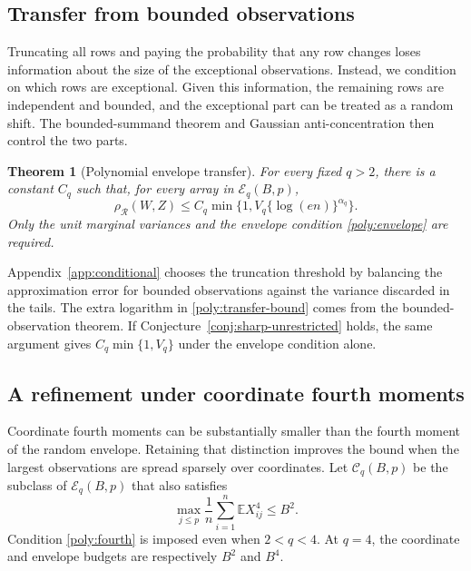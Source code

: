\documentclass[11pt,letterpaper]{article}
\newtheorem{theorem}{Theorem}
\theoremstyle{remark}
\newcommand{\E}{\mathbb E}
\newcommand{\rh}{\rho_{\mathcal R}}
\begin{document}
\subsection{Transfer from bounded observations}\label{poly:transfer-sec}

Truncating all rows and paying the probability that any row changes
loses information about the size of the exceptional observations.
Instead, we condition on which rows are exceptional. Given this
information, the remaining rows are independent and bounded, and the
exceptional part can be treated as a random shift. The bounded-summand
theorem and Gaussian anti-concentration then control the two parts.

\begin{theorem}[Polynomial envelope transfer]\label{poly:transfer}
For every fixed \(q>2\), there is a constant \(C_q\) such that, for
every array in \(\mathcal E_q(B,p)\),
\begin{equation}
 \rh(W,Z)\le C_q\min\{1,V_q\{\log(en)\}^{\alpha_q}\}.
 \label{poly:transfer-bound}
\end{equation}
Only the unit marginal variances and the envelope condition
\eqref{poly:envelope} are required.
\end{theorem}

Appendix~\ref{app:conditional} chooses the truncation threshold by
balancing the approximation error for bounded observations against the
variance discarded in the tails. The extra logarithm in
\eqref{poly:transfer-bound} comes from the bounded-observation theorem.
If Conjecture~\ref{conj:sharp-unrestricted} holds, the same argument
gives \(C_q\min\{1,V_q\}\) under the envelope condition alone.

\subsection{A refinement under coordinate fourth moments}\label{poly:bennett-sec}

Coordinate fourth moments can be substantially smaller than the fourth
moment of the random envelope. Retaining that distinction improves the
bound when the largest observations are spread sparsely over coordinates.
Let \(\mathcal C_q(B,p)\) be the subclass of \(\mathcal E_q(B,p)\)
that also satisfies
\begin{equation}
 \max_{j\le p}\frac1n\sum_{i=1}^n\E X_{ij}^4\le B^2.
 \label{poly:fourth}
\end{equation}
Condition \eqref{poly:fourth} is imposed even when \(2<q<4\).
At \(q=4\), the coordinate and envelope budgets are respectively
\(B^2\) and \(B^4\).
\end{document}
